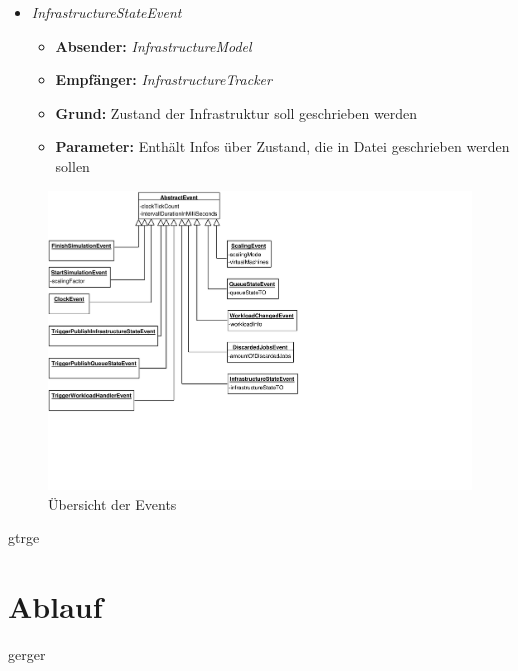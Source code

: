 \begin{itemize}
	\item \textit{InfrastructureStateEvent} 
\begin{itemize}
	\item \textbf{Absender:} \textit{InfrastructureModel}
	\item \textbf{Empfänger:} \textit{InfrastructureTracker}
	\item \textbf{Grund:}  Zustand der Infrastruktur soll geschrieben werden
	\item \textbf{Parameter:} Enthält Infos über Zustand, die in Datei geschrieben werden sollen
\end{itemize} 





\end{itemize}
 

\begin{figure}[!h]
	\centering
	
	\includegraphics[width=20.0cm, trim={0cm 5cm 6cm 0cm}]{img/eventsDiagram.pdf}
	
	\caption{Übersicht der Events}
	\label{fig:eventsDiagram}
\end{figure}


gtrge

\section{Ablauf}

gerger

